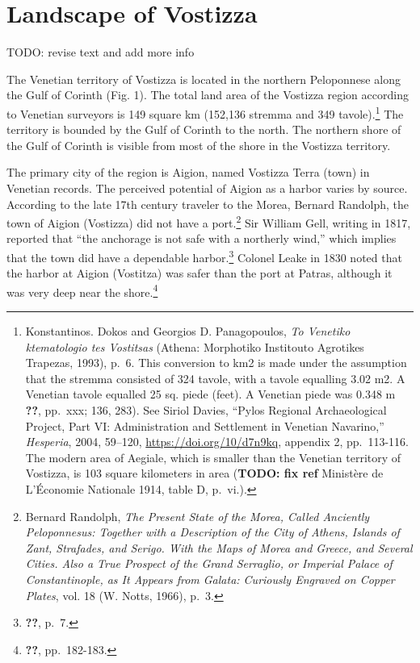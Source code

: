 \documentclass[english,]{book}
\begin{document}
\hypertarget{landscape}{%
\chapter{Landscape of Vostizza}\label{landscape}}

TODO: revise text and add more info

The Venetian territory of Vostizza is located in the northern Peloponnese along the Gulf of Corinth (Fig. 1). The total land area of the Vostizza region according to Venetian surveyors is 149 square km (152,136 stremma and 349 tavole).\footnote{Konstantinos. Dokos and Georgios D. Panagopoulos, \emph{To Venetiko ktematologio tes Vostitsas} (Athena: Morphotiko Institouto Agrotikes Trapezas, 1993), p.~6. This conversion to km2 is made under the assumption that the stremma consisted of 324 tavole, with a tavole equalling 3.02 m2. A Venetian tavole equalled 25 sq. piede (feet). A Venetian piede was 0.348 m {\textbf{??}}, pp.~xxx; 136, 283). See Siriol Davies, ``Pylos Regional Archaeological Project, Part VI: Administration and Settlement in Venetian Navarino,'' \emph{Hesperia}, 2004, 59--120, \url{https://doi.org/10/d7n9kq}, appendix 2, pp.~113-116. The modern area of Aegiale, which is smaller than the Venetian territory of Vostizza, is 103 square kilometers in area (\textbf{TODO: fix ref} Ministère de L'Économie Nationale 1914, table D, p.~vi.).} The territory is bounded by the Gulf of Corinth to the north. The northern shore of the Gulf of Corinth is visible from most of the shore in the Vostizza territory.

The primary city of the region is Aigion, named Vostizza Terra (town) in Venetian records. The perceived potential of Aigion as a harbor varies by source. According to the late 17th century traveler to the Morea, Bernard Randolph, the town of Aigion (Vostizza) did not have a port.\footnote{Bernard Randolph, \emph{The Present State of the Morea, Called Anciently Peloponnesus: Together with a Description of the City of Athens, Islands of Zant, Strafades, and Serigo. With the Maps of Morea and Greece, and Several Cities. Also a True Prospect of the Grand Serraglio, or Imperial Palace of Constantinople, as It Appears from Galata: Curiously Engraved on Copper Plates}, vol. 18 (W. Notts, 1966), p.~3.} Sir William Gell, writing in 1817, reported that ``the anchorage is not safe with a northerly wind,'' which implies that the town did have a dependable harbor.\footnote{{\textbf{??}}, p.~7.} Colonel Leake in 1830 noted that the harbor at Aigion (Vostitza) was safer than the port at Patras, although it was very deep near the shore.\footnote{{\textbf{??}}, pp.~182-183.}
\end{document}
